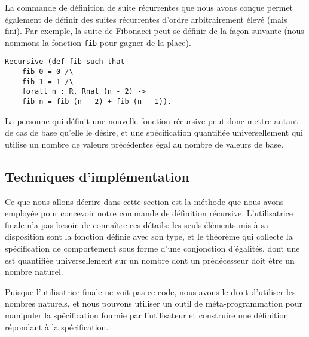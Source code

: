 \documentclass[draft]{jflart}
\begin{document}
La commande de définition de suite récurrentes que nous avons conçue permet
également de définir des suites récurrentes d'ordre arbitrairement élevé
(mais fini).  Par exemple,  la suite de Fibonacci peut se définir de la façon
suivante (nous nommons la fonction \texttt{fib} pour gagner de la place).

\begin{verbatim}
Recursive (def fib such that
    fib 0 = 0 /\
    fib 1 = 1 /\
    forall n : R, Rnat (n - 2) ->
    fib n = fib (n - 2) + fib (n - 1)).
\end{verbatim}
La personne qui définit une nouvelle fonction récursive peut donc
mettre autant de cas de base qu'elle le désire, et une spécification
quantifiée universellement qui utilise un nombre de valeurs
précédentes égal au nombre de valeurs de base.

\subsection{Techniques d'implémentation}
Ce que nous allons décrire dans cette section est la méthode que nous avons
employée pour concevoir notre commande de définition récursive.
L'utilisatrice finale n'a pas besoin de connaître ces détails: les
seuls éléments mis à sa disposition sont la fonction définie avec son
type, et le théorème qui collecte la spécification de comportement
sous forme d'une conjonction d'égalités, dont une est quantifiée
universellement sur un nombre dont un prédécesseur doit être un nombre
naturel.

Puisque l'utilisatrice finale ne voit pas ce code, nous avons le droit
d'utiliser les nombres naturels, et nous pouvons utiliser un outil de
méta-programmation pour manipuler la spécification fournie par
l'utilisateur et construire une définition répondant à la
spécification.
\end{document}
